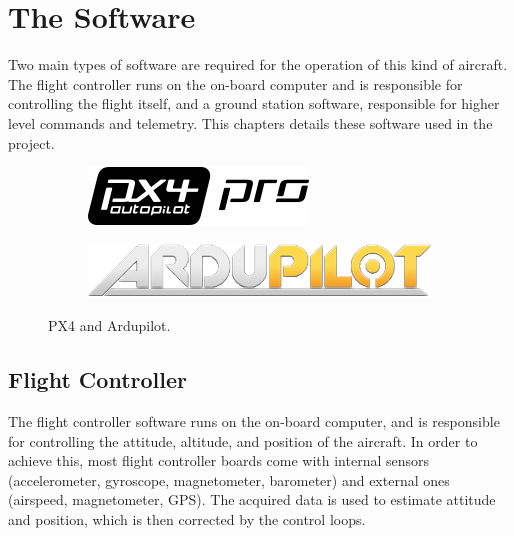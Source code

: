 \chapter{The Software} \label{chap:software}

Two main types of software are required for the operation of this kind of aircraft. The flight controller runs on the on-board computer and is responsible for controlling the flight itself, and a ground station software, responsible for higher level commands and telemetry.
This chapters details these software used in the project.

\begin{figure}[h]
  \centering
  \begin{subfigure}{.5\textwidth}
    \centering
    \includegraphics[width=\linewidth]{figs/px4.png}
  \end{subfigure}%
  \begin{subfigure}{.5\textwidth}
    \centering
    \includegraphics[width=\linewidth]{figs/ardupilot.png}

  \end{subfigure}
  \caption{PX4 and Ardupilot.}
  \label{fig:softwares}
\end{figure}


\section{Flight Controller}
The flight controller software runs on the on-board computer, and is responsible for controlling the attitude, altitude, and position of the aircraft.
%
In order to achieve this, most flight controller boards come with internal sensors (accelerometer, gyroscope, magnetometer, barometer) and external ones (airspeed, magnetometer, GPS). 
%
The acquired data is used to estimate attitude and position, which is then corrected by the control loops.

